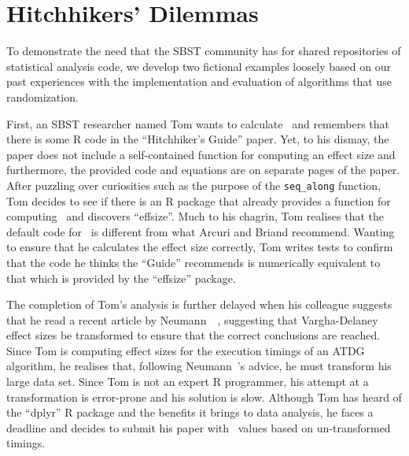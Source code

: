 
\vspace*{-1em}

\section{Hitchhikers' Dilemmas}
\label{sec:dilemma}

To demonstrate the need that the SBST community has for shared repositories of statistical analysis code, we develop two
fictional examples loosely based on our past experiences with the implementation and evaluation of algorithms that use
randomization.

First, an SBST researcher named Tom wants to calculate \atwelve~and remembers that there is some R code in the
``Hitchhiker's Guide'' paper. Yet, to his dismay, the paper does not include a self-contained function for computing an
effect size and furthermore, the provided code and equations are on separate pages of the paper. After puzzling over
curiosities such as the purpose of the {\tt seq\_along} function, Tom decides to see if there is an R package that
already provides a function for computing \atwelve~and discovers ``effsize''. Much to his chagrin, Tom realises that the
default code for \atwelve~is different from what Arcuri and Briand recommend. Wanting to ensure that he calculates the
effect size correctly, Tom writes tests to confirm that the code he thinks the ``Guide'' recommends is numerically
equivalent to that which is provided by the ``effsize'' package.

The completion of Tom's analysis is further delayed when his colleague suggests that he read a recent article by
Neumann~\etal~\cite{Neumann2015}, suggesting that Vargha-Delaney effect sizes be transformed to ensure that the correct
conclusions are reached. Since Tom is computing effect sizes for the execution timings of an ATDG algorithm, he realises
that, following Neumann~\etal's advice, he must transform his large data set. Since Tom is not an expert R programmer,
his attempt at a transformation is error-prone and his solution is slow. Although Tom has heard of the ``dplyr''
R package and the benefits it brings to data analysis, he faces a deadline and decides to submit his paper with
\atwelve~values based on un-transformed timings.

